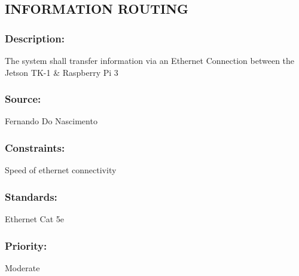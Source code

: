 \subsection{\text INFORMATION ROUTING }
\subsubsection{Description:} 
	{The system shall transfer information via an Ethernet Connection between the Jetson TK-1 \& Raspberry Pi 3}
\subsubsection{Source:} 
	{Fernando Do Nascimento}
\subsubsection{Constraints:} 
	{Speed of ethernet connectivity}
\subsubsection{Standards:} 
	{Ethernet Cat 5e}
\subsubsection{Priority:} 
	{Moderate}
